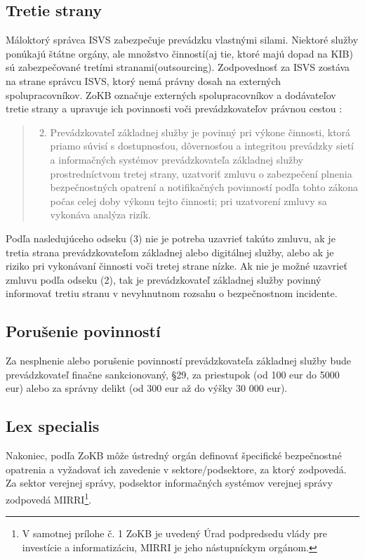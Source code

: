\subsection{Tretie strany}
Máloktorý správca ISVS zabezpečuje prevádzku vlastnými silami. Niektoré služby ponúkajú štátne orgány, ale množstvo
činností(aj tie, ktoré majú dopad na KIB) sú zabezpečované tretími stranami(outsourcing). Zodpovednosť za ISVS zostáva
na strane správcu ISVS, ktorý nemá právny dosah na externých spolupracovníkov. ZoKB označuje externých spolupracovníkov
a dodávateľov tretie strany a upravuje ich povinnosti voči prevádzkovateľov právnou cestou \cite[\S 19]{69/2018}:
\begin{quote}
  \begin{enumerate}[(1)] \setcounter{enumi}{1}
    \item Prevádzkovateľ základnej služby je povinný pri výkone činnosti, ktorá priamo súvisí s dostupnosťou, dôvernosťou
      a integritou prevádzky sietí a informačných systémov prevádzkovateľa základnej služby prostredníctvom tretej strany,
      uzatvoriť zmluvu o zabezpečení plnenia bezpečnostných opatrení a notifikačných povinností podľa tohto zákona počas celej
      doby výkonu tejto činnosti; pri uzatvorení zmluvy sa vykonáva analýza rizík.
  \end{enumerate}
\end{quote}
Podľa nasledujúceho odseku (3) nie je potreba uzavrieť takúto zmluvu, ak je tretia strana prevádzkovateľom základnej alebo
digitálnej služby, alebo ak je riziko pri vykonávaní činnosti voči tretej strane nízke. Ak nie je možné uzavrieť zmluvu
podľa odseku (2), tak je prevádzkovateľ základnej služby povinný informovať tretiu stranu v nevyhnutnom rozsahu o bezpečnostnom
incidente.

\subsection{Porušenie povinností}
Za nesplnenie alebo porušenie povinností prevádzkovateľa základnej služby bude prevádzkovateľ finačne sankcionovaný, 
\S 29, za priestupok (od 100 eur do 5000 eur) alebo za správny delikt (od 300 eur až do výšky 30 000 eur).

\subsection{Lex specialis}
Nakoniec, podľa \acrshort{ZoKB} môže ústredný orgán definovať špecifické bezpečnostné opatrenia a vyžadovať ich zavedenie
v sektore/podsektore, za ktorý zodpovedá. Za sektor verejnej správy, podsektor informačných systémov verejnej správy zodpovedá
\acrfull{MIRRI}\footnote{V samotnej prílohe č. 1 \acrshort{ZoKB} je uvedený Úrad podpredsedu vlády pre investície a informatizáciu,
\acrshort{MIRRI} je jeho nástupníckym orgánom.}.


